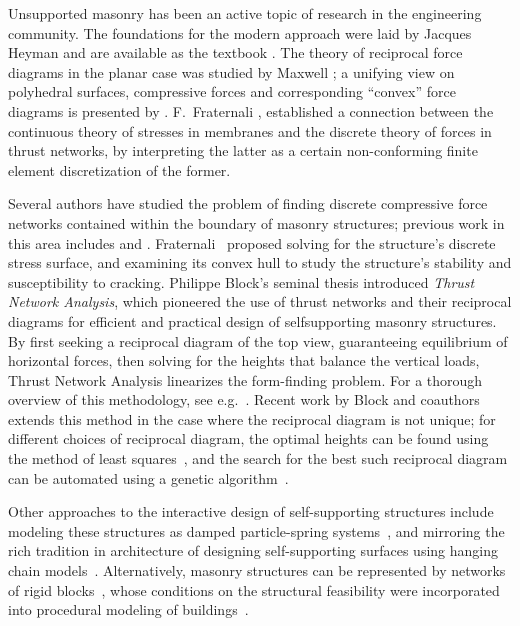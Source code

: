 \documentclass[review]{acmsiggraph}
\begin{document}
Unsupported masonry has been an active topic of research in the 
engineering community. The foundations for the modern approach were laid 
by Jacques Heyman  and are available as the textbook 
\cite{Heyman95}. The theory of reciprocal force diagrams in the planar
case was studied by Maxwell \cite{Maxwell64};
a unifying view on polyhedral surfaces, compressive 
forces and corresponding ``convex'' force diagrams is presented by 
\cite{Ash1988}. F.~Fraternali , 
 established a connection between the continuous 
theory of stresses in membranes and the discrete theory of forces in 
thrust networks, by interpreting the latter as a certain non-conforming 
finite element discretization of the former.

Several authors have studied the problem of finding discrete compressive 
force networks contained within the boundary of masonry structures; previous
work in this area includes \cite{O'Dwyer98} and
\cite{andreu-2007}. Fraternali~ proposed solving 
for the structure's discrete stress surface, and examining its convex hull 
to study the structure's stability and susceptibility to cracking. 
Philippe Block's seminal thesis introduced {\it Thrust 
Network Analysis}, which pioneered the use of thrust networks and their
reciprocal diagrams for efficient and practical design of self\dash supporting
masonry structures. By first seeking a reciprocal diagram of the top view, guaranteeing equilibrium 
of horizontal forces, then solving for the heights that balance the 
vertical loads, Thrust Network Analysis linearizes the form-finding problem.
For a thorough overview of this methodology, see e.g.\ \cite{Block07,block09}. 
Recent work by Block and coauthors extends this method in the case where the reciprocal diagram 
is not unique; for different choices of reciprocal diagram, the optimal 
heights can be found using the method of least squares~\cite{vanmele2011}, 
and the search for the best such reciprocal diagram can be automated using 
a genetic algorithm~\cite{Block2011}.

Other approaches to the interactive design of self-supporting structures 
include modeling these structures as damped particle-spring 
systems~\cite{Kilian2005,barnes09}, and mirroring the rich tradition in 
architecture of designing self-supporting surfaces using hanging chain 
models~\cite{Heyman98}. Alternatively, masonry structures can be 
represented by networks of rigid blocks~\cite{Livesley92}, whose conditions 
on the structural feasibility were incorporated into procedural modeling 
of buildings~\cite{Whiting09}.
\end{document}
